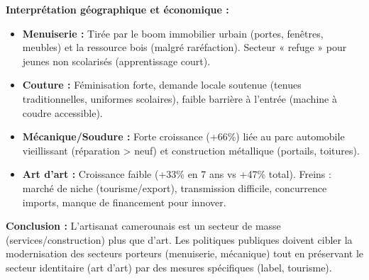 \documentclass[11pt]{article}
\newcommand{\cle}[1]{{\popxbold\color{popdark}#1}}
\begin{document}
\begin{exoresolu}
\textbf{Interprétation géographique et économique :}
\begin{itemize}
    \item \textbf{Menuiserie :} Tirée par le boom immobilier urbain (portes, fenêtres, meubles) et la ressource bois (malgré raréfaction). Secteur « refuge » pour jeunes non scolarisés (apprentissage court).
    \item \textbf{Couture :} Féminisation forte, demande locale soutenue (tenues traditionnelles, uniformes scolaires), faible barrière à l'entrée (machine à coudre accessible).
    \item \textbf{Mécanique/Soudure :} Forte croissance (+66\%) liée au parc automobile vieillissant (réparation > neuf) et construction métallique (portails, toitures).
    \item \textbf{Art d'art :} Croissance faible (+33\% en 7 ans vs +47\% total). Freins : marché de niche (tourisme/export), transmission difficile, concurrence imports, manque de financement pour innover.
\end{itemize}
\textbf{Conclusion :} L'artisanat camerounais est un \cle{secteur de masse} (services/construction) plus que d'art. Les politiques publiques doivent cibler la modernisation des secteurs porteurs (menuiserie, mécanique) tout en préservant le secteur identitaire (art d'art) par des mesures spécifiques (label, tourisme).
\end{exoresolu}
\end{document}
